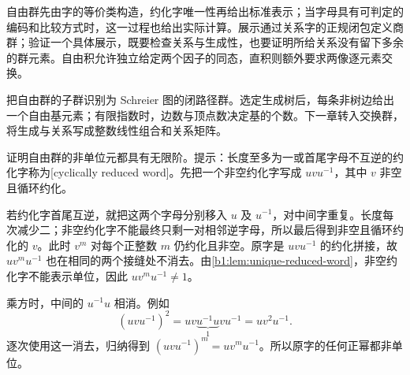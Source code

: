 




\begin{chaptersummary}
	自由群先由字的等价类构造，约化字唯一性再给出标准表示；当字母具有可判定的编码和比较方式时，这一过程也给出实际计算。展示通过关系字的正规闭包定义商群；验证一个具体展示，既要检查关系与生成性，也要证明所给关系没有留下多余的群元素。自由积允许独立给定两个因子的同态，直积则额外要求两像逐元素交换。

	\ProseParagraphBreak
	把自由群的子群识别为 Schreier 图的闭路径群。选定生成树后，每条非树边给出一个自由基元素；有限指数时，边数与顶点数决定基的个数。下一章转入交换群，将生成与关系写成整数线性组合和关系矩阵。
\end{chaptersummary}

\BookExercises

\begin{exercise}\label{b1:ex:08-torsion-free}
	证明自由群的非单位元都具有无限阶。提示：长度至多为一或首尾字母不互逆的约化字称为[cyclically reduced word]。先把一个非空约化字写成 \(uvu^{-1}\)，其中 \(v\) 非空且循环约化。
\end{exercise}
\begin{solution}
	若约化字首尾互逆，就把这两个字母分别移入 \(u\) 及 \(u^{-1}\)，对中间字重复。长度每次减少二；非空约化字不能最终只剩一对相邻逆字母，所以最后得到非空且循环约化的 \(v\)。此时 \(v^m\) 对每个正整数 \(m\) 仍约化且非空。原字是 \(uvu^{-1}\) 的约化拼接，故 \(uv^mu^{-1}\) 也在相同的两个接缝处不消去。由\cref{b1:lem:unique-reduced-word}，非空约化字不能表示单位，因此 \(uv^mu^{-1}\ne1\)。

	乘方时，中间的 \(u^{-1}u\) 相消。例如
	\[
		(uvu^{-1})^2 =uv\underbrace{u^{-1}u}_{1}vu^{-1} =uv^2u^{-1}.
	\]
	逐次使用这一消去，归纳得到 \((uvu^{-1})^m=uv^mu^{-1}\)。所以原字的任何正幂都非单位。
\end{solution}

